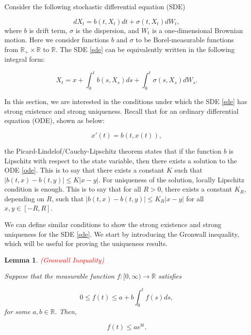 \documentclass{article}
\newtheorem{lemma}{Lemma}
\begin{document}
Consider the following stochastic differential equation (SDE)

\begin{equation} \label{sde}
dX_t = b(t,X_t)dt + \sigma(t,X_t)dW_t,
\end{equation}
where $b$ is drift term, $\sigma$ is the dispersion, and $W_t$ is a one-dimensional Brownian motion. Here we consider functions $b$ and $\sigma$ to be Borel-measurable functions from $\mathbb{R}_+\times\mathbb{R}$ to $\mathbb{R}$. The SDE \eqref{sde} can be equivalently written in the following integral form:

\begin{equation*}
X_t = x + \int_0^t b(s,X_s)ds + \int^t_0 \sigma(s,X_s)dW_s.
\end{equation*}

In this section, we are interested in the conditions under which the SDE \eqref{sde} has strong existence and strong uniqueness. Recall that for an ordinary differential equation (ODE), shown as below:

\begin{equation} \label{ode}
x'(t) = b(t,x(t)),
\end{equation}

the Picard-Lindelof/Cauchy-Lipschitz theorem states that if the function $b$ is Lipschitz with respect to the state variable, then there exists a solution to the ODE \eqref{ode}. This is to say that there exists a constant $K$ such that $|b(t,x)-b(t,y)|\leq K|x-y|$. For uniqueness of the solution, locally Lipschitz condition is enough. This is to say that for all $R>0$, there exists a constant $K_R$, depending on $R$, such that $|b(t,x)-b(t,y)|\leq K_R|x-y|$ for all $x,y\in[-R,R]$.

We can define similar conditions to show the strong existence and strong uniqueness for the SDE \eqref{sde}. We start by introducing the Gronwall inequality, which will be useful for proving the uniqueness results.
 
\begin{lemma} \label{lemma:gronwall} \textcolor{red}{(Gronwall Inequality)}

Suppose that the measurable function $f:[0,\infty)\rightarrow\mathbb{R}$ satisfies

\begin{equation*}
0\leq f(t)\leq a+b\int^t_0 f(s)ds,
\end{equation*}
for some $a,b\in\mathbb{R}$. Then, 

\begin{equation*}
f(t)\leq ae^{bt}.
\end{equation*}

\end{lemma}
\end{document}

